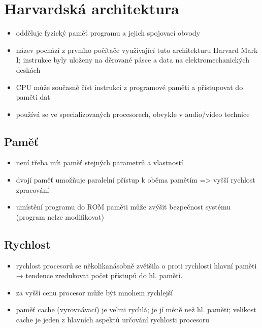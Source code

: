 \documentclass[a4paper,12pt]{article}
\begin{document}
\section{Harvardská architektura}
    \begin{itemize}
        \item{odděluje fyzický paměť programu a jejich spojovací obvody}
        \item{název pochází z prvního počítače využívající tuto architekturu Harvard Mark I; instrukce byly uloženy na děrované pásce a data na elektromechanických deskách}
        \item{CPU může současně číst instrukci z programové paměti a přistupovat do paměti dat}
        \item{používá se ve specializovaných procesorech, obvykle v audio/video technice}
    \end{itemize}
    \subsection{Paměť}
        \begin{itemize}
            \item{není třeba mít paměť stejných parametrů a vlastností}
            \item{dvojí paměť umožňuje paralelní přístup k oběma pamětím => vyšší rychlost zpracování}
            \item{umístění programu do ROM paměti může zvýšit bezpečnost systému (program nelze modifikovat)}
        \end{itemize}
    \subsection{Rychlost}
        \begin{itemize}
            \item{rychlost procesorů se několikanásobně zvětšila o proti rychlosti hlavní paměti → tendence zredukovat počet přístupů do hl. paměti.}
            \item{za vyšší cenu procesor může být mnohem rychlejší}
            \item{paměť cache (vyrovnávací) je velmi rychlá; je jí méně než hl. paměti; velikost cache je jeden z hlavních aspektů určování rychlosti procesoru}
        \end{itemize}
\end{document}
